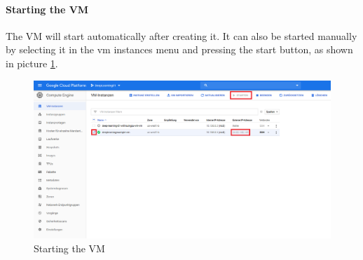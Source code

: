 \documentclass[a4paper]{article}
\begin{document}
\paragraph{Starting the VM}
The VM will start automatically after creating it. It can also be started  manually by selecting it in the vm instances menu and pressing the start button, as shown in picture \ref{fig_startVM}.
\begin{figure}[H]
	\centerline{\includegraphics[width=\textwidth]{img/startVM}}
	\caption{Starting the VM}
	\label{fig_startVM}
\end{figure}
\end{document}
